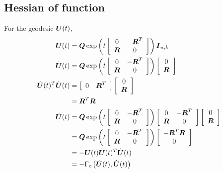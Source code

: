 \documentclass[11pt]{article}
\begin{document}
\subsection{Hessian of function}
For the geodesic $\boldsymbol{U}(t)$, 
\begin{align*}
\boldsymbol{U}(t) &= \boldsymbol{Q}\exp\left(t \left[\begin{array}{cc}
0 & -\boldsymbol{R}^{T} \\ 
\boldsymbol{R} & 0
\end{array} \right]\right)\boldsymbol{I}_{n,k}\\
\dot{\boldsymbol{U}}(t) &=  \boldsymbol{Q}\exp\left(t \left[\begin{array}{cc}
0 & -\boldsymbol{R}^{T} \\ 
\boldsymbol{R} & 0
\end{array} \right]\right)\left[\begin{array}{c}
0 \\ 
\boldsymbol{R} 
\end{array} \right]\\
\dot{\boldsymbol{U}}(t)^{T}\dot{\boldsymbol{U}}(t) &=\left[\begin{array}{cc}
0 & 
\boldsymbol{R}^{T} 
\end{array} \right]\left[\begin{array}{c}
0 \\ 
\boldsymbol{R} 
\end{array} \right]\\
 &= \boldsymbol{R}^{T} \boldsymbol{R}\\
\ddot{\boldsymbol{U}}(t) &=  \boldsymbol{Q}\exp\left(t \left[\begin{array}{cc}
0 & -\boldsymbol{R}^{T} \\ 
\boldsymbol{R} & 0
\end{array} \right]\right)\left[\begin{array}{cc}
0 & -\boldsymbol{R}^{T} \\ 
\boldsymbol{R} & 0
\end{array} \right]\left[\begin{array}{c}
0 \\ 
\boldsymbol{R} 
\end{array} \right]\\
&=  \boldsymbol{Q}\exp\left(t \left[\begin{array}{cc}
0 & -\boldsymbol{R}^{T} \\ 
\boldsymbol{R} & 0
\end{array} \right]\right)\left[\begin{array}{cc}
-\boldsymbol{R}^{T}\boldsymbol{R}  \\ 
 0
\end{array} \right]\\
&= -\boldsymbol{U}(t) \dot{\boldsymbol{U}}(t)^{T}\dot{\boldsymbol{U}}(t)\\
&= -\Gamma_{c}\left(\dot{\boldsymbol{U}}(t), \dot{\boldsymbol{U}}(t)\right)
\end{align*}
\end{document}
